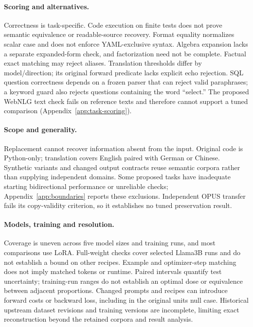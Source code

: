 \documentclass[11pt]{article}
\begin{document}
\paragraph{Scoring and alternatives.}
Correctness is task-specific. Code execution on finite tests does not prove semantic
equivalence or readable-source recovery. Format equality normalizes scalar case and does
not enforce YAML-exclusive syntax. Algebra expansion lacks a separate expanded-form check,
and factorization need not be complete. Factual exact matching may reject aliases.
Translation thresholds differ by model/direction; its original forward predicate lacks
explicit echo rejection. SQL question correctness depends on a frozen parser that can
reject valid paraphrases; a keyword guard also rejects questions containing the word
``select.'' The proposed WebNLG text check fails on reference texts and
therefore cannot support a tuned comparison (Appendix~\ref{app:task-scoring}).

\paragraph{Scope and generality.}
Replacement cannot recover information absent from the input. Original code is Python-only;
translation covers English paired with German or Chinese. Synthetic variants and changed
output contracts reuse semantic corpora rather than supplying independent domains.
Some proposed tasks have inadequate starting bidirectional performance or unreliable
checks; Appendix~\ref{app:boundaries} reports these exclusions. Independent OPUS transfer
fails its copy-validity criterion, so it establishes no tuned preservation result.

\paragraph{Models, training and resolution.}
Coverage is uneven across five model sizes and training runs, and most comparisons use
LoRA. Full-weight checks cover selected Llama3B runs and do not establish a bound on other
recipes. Example and optimizer-step matching does not imply matched tokens or runtime.
Paired intervals quantify test uncertainty; training-run ranges do not establish an
optimal dose or equivalence between adjacent proportions. Changed prompts and recipes
can introduce forward costs or backward loss, including in the original units null case.
Historical upstream dataset revisions and training versions are incomplete, limiting exact
reconstruction beyond the retained corpora and result analysis.
\end{document}
